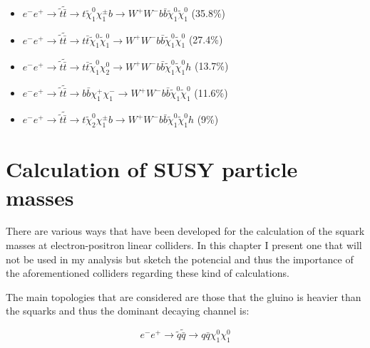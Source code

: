 \documentclass[12pt,a4paper]{report}
\begin{document}
\begin{itemize}
 \item $e^{-}e^{+} \rightarrow \tilde{t}\tilde{\bar{t}} \rightarrow t \tilde{\chi}_{1}^{0}
 \chi^{\pm}_{1}b \rightarrow
 W^{+}W^{-} b \bar{b} \tilde{\chi}_{1}^{0}  \tilde{\chi}_{1}^{0}$ \quad (35.8\%)

 \item $e^{-}e^{+} \rightarrow \tilde{t}\tilde{\bar{t}} \rightarrow t\bar{t} \tilde{\chi}_{1}^{0}
 \tilde{\chi}^{0}_{1} \rightarrow
 W^{+}W^{-} b \bar{b} \tilde{\chi}_{1}^{0}  \tilde{\chi}_{1}^{0}$ \quad (27.4\%)

 \item $e^{-}e^{+} \rightarrow \tilde{t}\tilde{\bar{t}} \rightarrow t\bar{t} \tilde{\chi}_{1}^{0}
 \chi^{0}_{2} \rightarrow
 W^{+}W^{-} b \bar{b} \tilde{\chi}_{1}^{0}  \tilde{\chi}_{1}^{0}h$ \quad (13.7\%)
 
 \item $e^{-}e^{+} \rightarrow \tilde{t}\tilde{\bar{t}} \rightarrow b\bar{b} \chi_{1}^{+}
 \chi^{-}_{1} \rightarrow
 W^{+}W^{-} b \bar{b} \tilde{\chi}_{1}^{0}  \tilde{\chi}_{1}^{0}$ \quad (11.6\%)
 
 \item $e^{-}e^{+} \rightarrow \tilde{t}\tilde{\bar{t}} \rightarrow t \tilde{\chi}_{2}^{0}
 \chi^{\pm}_{1}b \rightarrow
 W^{+}W^{-} b \bar{b} \tilde{\chi}_{1}^{0}  \tilde{\chi}_{1}^{0}h$ \quad (9\%)
 
 \end{itemize}


\newpage

\section{Calculation of SUSY particle masses}

There are various ways that have been developed for the calculation of the squark masses at electron-positron
linear colliders. In this chapter I present one that will not be used in my analysis but sketch the potencial
and thus the importance of the aforementioned colliders regarding these kind of calculations.

The main topologies that are considered are those that the gluino is heavier than the squarks and thus the 
dominant decaying channel is:

\begin{equation}
 e^{-}e^{+} \rightarrow \tilde{q} \tilde{\bar{q}} \rightarrow q\bar{q}\chi_{1}^{0}\chi_{1}^{0}
\end{equation}
\end{document}
